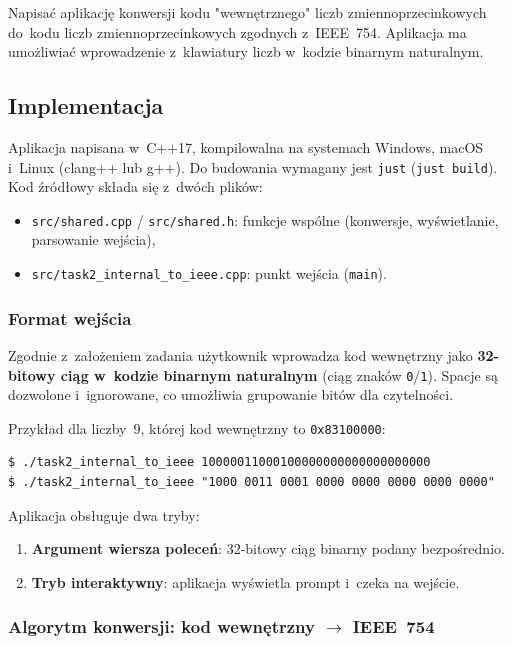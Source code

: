 \documentclass[12pt,a4paper]{article}
\begin{document}
Napisać aplikację konwersji kodu "wewnętrznego" liczb
zmiennoprzecinkowych do~kodu liczb zmiennoprzecinkowych zgodnych z~IEEE~754.
Aplikacja ma umożliwiać wprowadzenie z~klawiatury liczb w~kodzie binarnym
naturalnym.

\subsection*{Implementacja}

Aplikacja napisana w~C++17, kompilowalna na systemach Windows, macOS i~Linux
(clang++ lub g++). Do budowania wymagany jest \texttt{just} (\texttt{just build}).
Kod źródłowy składa się z~dwóch plików:

\begin{itemize}
  \item \texttt{src/shared.cpp} / \texttt{src/shared.h}: funkcje wspólne
        (konwersje, wyświetlanie, parsowanie wejścia),
  \item \texttt{src/task2\_internal\_to\_ieee.cpp}: punkt wejścia (\texttt{main}).
\end{itemize}

\subsubsection*{Format wejścia}

Zgodnie z~założeniem zadania użytkownik wprowadza kod wewnętrzny jako
\textbf{32-bitowy ciąg w~kodzie binarnym naturalnym} (ciąg znaków \texttt{0}/\texttt{1}).
Spacje są dozwolone i~ignorowane, co umożliwia grupowanie bitów dla czytelności.

Przykład dla liczby~9, której kod wewnętrzny to \texttt{0x83100000}:


\begin{lstlisting}[language={},numbers=none]
$ ./task2_internal_to_ieee 10000011000100000000000000000000
$ ./task2_internal_to_ieee "1000 0011 0001 0000 0000 0000 0000 0000"
\end{lstlisting}

Aplikacja obsługuje dwa tryby:
\begin{enumerate}[label=\arabic*.]
  \item \textbf{Argument wiersza poleceń}: 32-bitowy ciąg binarny podany bezpośrednio.
  \item \textbf{Tryb interaktywny}: aplikacja wyświetla prompt i~czeka na wejście.
\end{enumerate}

\subsubsection*{Algorytm konwersji: kod wewnętrzny $\to$ IEEE~754}
\end{document}
